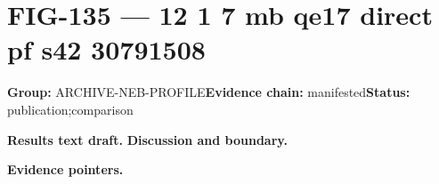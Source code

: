 \clearpage
\section{FIG-135 --- 12 1 7 mb qe17 direct pf s42 30791508}
\label{figpage:fig-135}
\textbf{Group:} ARCHIVE-NEB-PROFILE\quad \textbf{Evidence chain:} manifested\quad \textbf{Status:} publication;comparison

\textbf{Results text draft.} 
\textbf{Discussion and boundary.} 


\textbf{Evidence pointers.}



\vfill
